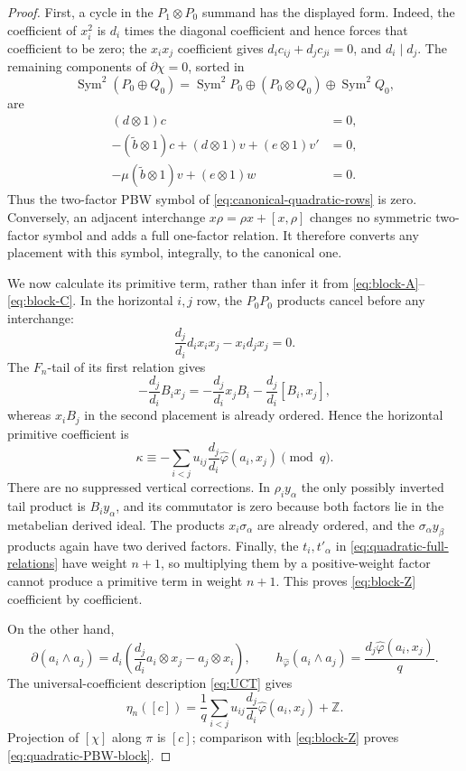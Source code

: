 \documentclass[11pt]{amsart}
\theoremstyle{remark}
\newcommand{\Z}{\mathbb Z}
\newcommand{\Sym}{\operatorname{Sym}}
\begin{document}
\begin{proof}
First, a cycle in the $P_1\otimes P_0$ summand has the displayed form.
Indeed, the coefficient of $x_i^2$ is $d_i$ times the diagonal
coefficient and hence forces that coefficient to be zero; the
$x_ix_j$ coefficient gives
$d_i c_{ij}+d_jc_{ji}=0$, and $d_i\mid d_j$.  The remaining components
of $\partial\chi=0$, sorted in
\[
 \Sym^2(P_0\oplus Q_0)=
 \Sym^2P_0\oplus(P_0\otimes Q_0)\oplus\Sym^2Q_0,
\]
are
\begin{align}
 (d\otimes1)c&=0,\label{eq:block-A}\\
 -(\widetilde b\otimes1)c
 +(d\otimes1)v+(e\otimes1)v'&=0,\label{eq:block-B}\\
 -\mu(\widetilde b\otimes1)v+(e\otimes1)w&=0.
 \label{eq:block-C}
\end{align}
Thus the two-factor PBW symbol of \eqref{eq:canonical-quadratic-rows}
is zero.  Conversely, an adjacent interchange
$x\rho=\rho x+[x,\rho]$ changes no symmetric two-factor symbol and
adds a full one-factor relation.  It therefore converts any placement
with this symbol, integrally, to the canonical one.

We now calculate its primitive term, rather than infer it from
\eqref{eq:block-A}--\eqref{eq:block-C}.  In the horizontal $i,j$ row,
the $P_0P_0$ products cancel before any interchange:
\[
 \frac{d_j}{d_i}d_ix_ix_j-x_id_jx_j=0.
\]
The $F_n$-tail of its first relation gives
\[
 -\frac{d_j}{d_i}B_ix_j
 =-\frac{d_j}{d_i}x_jB_i
  -\frac{d_j}{d_i}[B_i,x_j],
\]
whereas $x_iB_j$ in the second placement is already ordered.  Hence
the horizontal primitive coefficient is
\begin{equation}\label{eq:block-Z}
 \kappa\equiv-
 \sum_{i<j}u_{ij}\frac{d_j}{d_i}
 \widehat\varphi(a_i,x_j)\pmod q.
\end{equation}
There are no suppressed vertical corrections.  In $\rho_i y_\alpha$
the only possibly inverted tail product is $B_i y_\alpha$, and its
commutator is zero because both factors lie in the metabelian derived
ideal.  The products $x_i\sigma_\alpha$ are already ordered, and the
$\sigma_\alpha y_\beta$ products again have two derived factors.
Finally, the $t_i,t'_\alpha$ in
\eqref{eq:quadratic-full-relations} have weight $n+1$, so multiplying
them by a positive-weight factor cannot produce a primitive term in
weight $n+1$.  This proves \eqref{eq:block-Z} coefficient by
coefficient.

On the other hand,
\[
 \partial(a_i\wedge a_j)=d_i
 \left(\frac{d_j}{d_i}a_i\otimes x_j-a_j\otimes x_i\right),
 \qquad
 h_{\widehat\varphi}(a_i\wedge a_j)
 =\frac{d_j\widehat\varphi(a_i,x_j)}q.
\]
The universal-coefficient description \eqref{eq:UCT} gives
\[
 \eta_n([c])=
 \frac1q\sum_{i<j}u_{ij}\frac{d_j}{d_i}
 \widehat\varphi(a_i,x_j)+\Z.
\]
Projection of $[\chi]$ along $\pi$ is $[c]$; comparison with
\eqref{eq:block-Z} proves \eqref{eq:quadratic-PBW-block}.
\end{proof}
\end{document}
